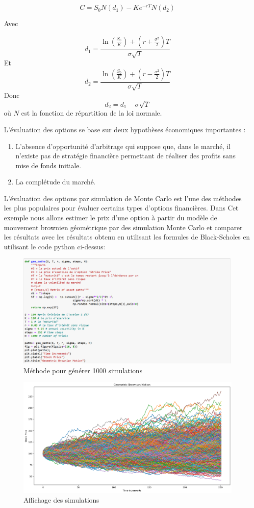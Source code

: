 \documentclass[A4paper,12pt]{report}
\begin{document}
$$C=S_{0} N\left(d_{1}\right)-K e^{-r T} N\left(d_{2}\right)$$

Avec

$$d_{1}=\frac{\ln \left(\frac{S_{0}}{K}\right)+\left(r+\frac{\sigma^{2}}{2}\right) T}{\sigma \sqrt{T}}$$
Et 
$$d_{2}=\frac{\ln \left(\frac{S_{0}}{K}\right)+\left(r-\frac{\sigma^{2}}{2}\right) T}{\sigma \sqrt{T}}$$
Donc $$d_2 = d_1 -\sigma \sqrt{T}$$
où $N$ est la fonction de répartition de la loi normale.

L’évaluation des options se base sur deux hypothèses  économiques importantes :
\begin{enumerate}
\item  L'absence d’opportunité d’arbitrage qui suppose que, dans le marché, il n'existe pas de stratégie financière permettant de réaliser des profits sans mise de fonds initiale.
\item La complétude du marché.
\end{enumerate}
L'évaluation des options par simulation de Monte Carlo est l'une des méthodes les plus populaires pour évaluer certains types d'options financières. Dans Cet exemple nous allons estimer le prix d'une option à partir du modèle de mouvement brownien géométrique par des simulation Monte Carlo et comparer les résultats avec les résultats obtenu en utilisant   les formules de Black-Scholes en utilisant le code python ci-dessus:
\begin{figure}[h]
  \centering
  \includegraphics[scale=0.7]{Meth_sim}
  \caption{Méthode pour générer 1000 simulations}
  \label{fig:mon_image}
\end{figure}
\begin{figure}[h]
  \centering
  \includegraphics[scale=0.55]{res_sim}
  \caption{Affichage des simulations}
  \label{fig:mon_image}
\end{figure}
\end{document}
